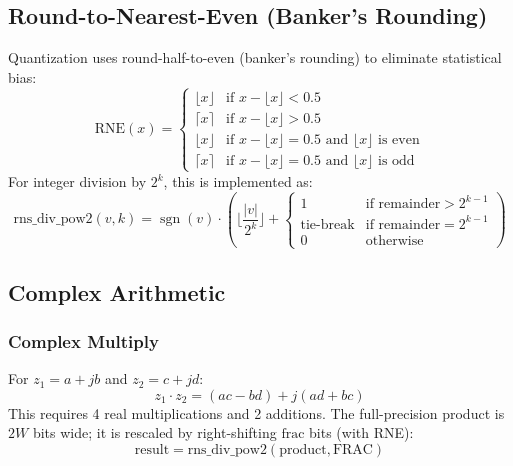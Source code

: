 \documentclass[11pt,a4paper]{article}
\theoremstyle{definition}
\theoremstyle{remark}
\newcommand{\abs}[1]{\left\lvert#1\right\rvert}
\newcommand{\sign}{\operatorname{sgn}}
\begin{document}
\subsection{Round-to-Nearest-Even (Banker's Rounding)}

Quantization uses round-half-to-even (banker's rounding) to eliminate
statistical bias:
\begin{equation}
  \text{RNE}(x) = \begin{cases}
    \lfloor x \rfloor & \text{if } x - \lfloor x \rfloor < 0.5 \\
    \lceil x \rceil & \text{if } x - \lfloor x \rfloor > 0.5 \\
    \lfloor x \rfloor & \text{if } x - \lfloor x \rfloor = 0.5 \text{ and } \lfloor x \rfloor \text{ is even} \\
    \lceil x \rceil & \text{if } x - \lfloor x \rfloor = 0.5 \text{ and } \lfloor x \rfloor \text{ is odd}
  \end{cases}
\end{equation}
For integer division by $2^k$, this is implemented as:
\begin{equation}
  \text{rns\_div\_pow2}(v, k) = \sign(v) \cdot \left( \lfloor \frac{\abs{v}}{2^k} \rfloor + \begin{cases} 1 & \text{if remainder} > 2^{k-1} \\ \text{tie-break} & \text{if remainder} = 2^{k-1} \\ 0 & \text{otherwise} \end{cases} \right)
\end{equation}

\subsection{Complex Arithmetic}

\subsubsection{Complex Multiply}
For $z_1 = a + jb$ and $z_2 = c + jd$:
\begin{equation}
  z_1 \cdot z_2 = (ac - bd) + j(ad + bc)
  \label{eq:complex_mul}
\end{equation}
This requires 4 real multiplications and 2 additions. The full-precision product
is $2W$ bits wide; it is rescaled by right-shifting $\text{frac}$ bits (with RNE):
\begin{equation}
  \text{result} = \text{rns\_div\_pow2}(\text{product}, \text{FRAC})
\end{equation}
\end{document}
